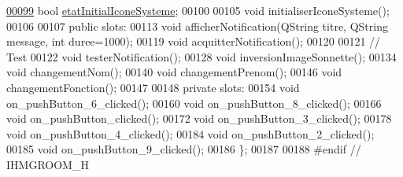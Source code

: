 \begin{DoxyCode}
\hyperlink{class_ihm_groom_a95d2d2b4b3b849c1b21f234844fca056}{00099}     \textcolor{keywordtype}{bool} \hyperlink{class_ihm_groom_a95d2d2b4b3b849c1b21f234844fca056}{etatInitialIconeSysteme};                   
00100 
00105     \textcolor{keywordtype}{void} initialiserIconeSysteme();
00106 
00107 \textcolor{keyword}{public} slots:
00113     \textcolor{keywordtype}{void} afficherNotification(QString titre, QString message, \textcolor{keywordtype}{int} duree=1000);
00119     \textcolor{keywordtype}{void} acquitterNotification();
00120 
00121     \textcolor{comment}{// Test}
00122     \textcolor{keywordtype}{void} testerNotification();
00128     \textcolor{keywordtype}{void} inversionImageSonnette();
00134     \textcolor{keywordtype}{void} changementNom();
00140     \textcolor{keywordtype}{void} changementPrenom();
00146     \textcolor{keywordtype}{void} changementFonction();
00147 
00148 \textcolor{keyword}{private} slots:
00154     \textcolor{keywordtype}{void} on\_pushButton\_6\_clicked();
00160     \textcolor{keywordtype}{void} on\_pushButton\_8\_clicked();
00166     \textcolor{keywordtype}{void} on\_pushButton\_clicked();
00172     \textcolor{keywordtype}{void} on\_pushButton\_3\_clicked();
00178     \textcolor{keywordtype}{void} on\_pushButton\_4\_clicked();
00184     \textcolor{keywordtype}{void} on\_pushButton\_2\_clicked();
00185     \textcolor{keywordtype}{void} on\_pushButton\_9\_clicked();
00186 \};
00187 
00188 \textcolor{preprocessor}{#endif // IHMGROOM\_H}
\end{DoxyCode}
